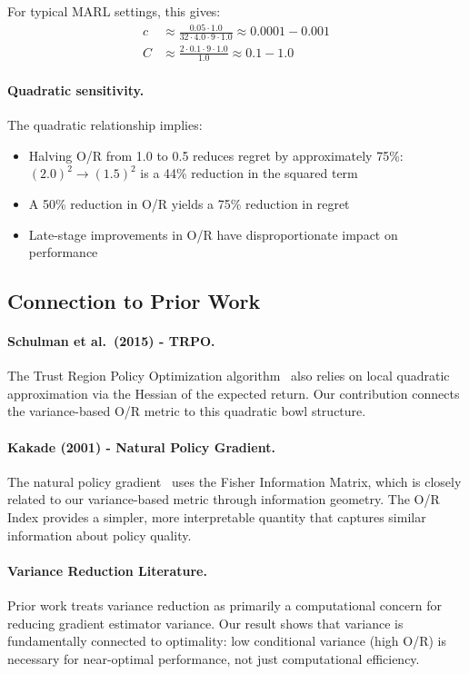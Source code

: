 For typical MARL settings, this gives:
\begin{align}
    c &\approx \frac{0.05 \cdot 1.0}{32 \cdot 4.0 \cdot 9 \cdot 1.0} \approx 0.0001 - 0.001 \\
    C &\approx \frac{2 \cdot 0.1 \cdot 9 \cdot 1.0}{1.0} \approx 0.1 - 1.0
\end{align}

\paragraph{Quadratic sensitivity.} The quadratic relationship implies:
\begin{itemize}
    \item Halving O/R from 1.0 to 0.5 reduces regret by approximately 75\%: $(2.0)^2 \to (1.5)^2$ is a 44\% reduction in the squared term
    \item A 50\% reduction in O/R yields a 75\% reduction in regret
    \item Late-stage improvements in O/R have disproportionate impact on performance
\end{itemize}

\subsection{Connection to Prior Work}

\paragraph{Schulman et al.~(2015) - TRPO.} The Trust Region Policy Optimization algorithm~\citep{schulman2015trust} also relies on local quadratic approximation via the Hessian of the expected return. Our contribution connects the variance-based O/R metric to this quadratic bowl structure.

\paragraph{Kakade (2001) - Natural Policy Gradient.} The natural policy gradient~\citep{kakade2001natural} uses the Fisher Information Matrix, which is closely related to our variance-based metric through information geometry. The O/R Index provides a simpler, more interpretable quantity that captures similar information about policy quality.

\paragraph{Variance Reduction Literature.} Prior work treats variance reduction as primarily a computational concern for reducing gradient estimator variance. Our result shows that variance is fundamentally connected to optimality: low conditional variance (high O/R) is necessary for near-optimal performance, not just computational efficiency.

